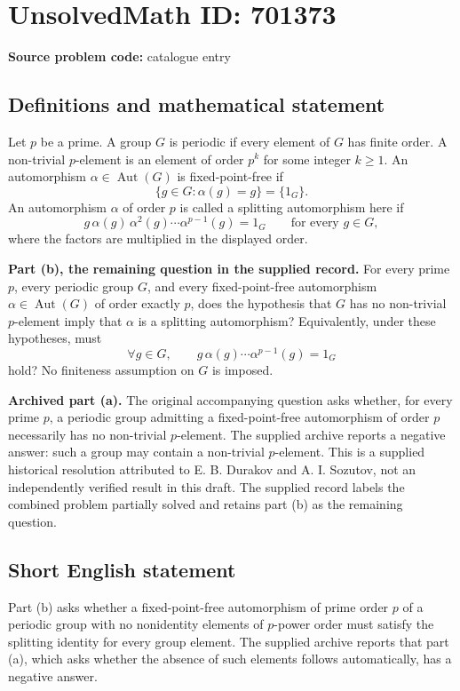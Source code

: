 \documentclass[11pt]{article}
\begin{document}
\section*{UnsolvedMath ID: 701373}
\textbf{Source problem code:} catalogue entry
\subsection{Definitions and mathematical statement}
Let \(p\) be a prime. A group \(G\) is periodic if every element of \(G\) has finite order. A non-trivial \(p\)-element is an element of order \(p^k\) for some integer \(k\geq 1\). An automorphism \(\alpha\in\operatorname{Aut}(G)\) is fixed-point-free if
\[
\{g\in G:\alpha(g)=g\}=\{1_G\}.
\]
An automorphism \(\alpha\) of order \(p\) is called a splitting automorphism here if
\[
 g\,\alpha(g)\,\alpha^2(g)\cdots\alpha^{p-1}(g)=1_G
 \qquad\text{for every }g\in G,
\]
where the factors are multiplied in the displayed order.

\textbf{Part (b), the remaining question in the supplied record.} For every prime \(p\), every periodic group \(G\), and every fixed-point-free automorphism \(\alpha\in\operatorname{Aut}(G)\) of order exactly \(p\), does the hypothesis that \(G\) has no non-trivial \(p\)-element imply that \(\alpha\) is a splitting automorphism? Equivalently, under these hypotheses, must
\[
\forall g\in G,\qquad
 g\,\alpha(g)\cdots\alpha^{p-1}(g)=1_G
\]
hold? No finiteness assumption on \(G\) is imposed.

\textbf{Archived part (a).} The original accompanying question asks whether, for every prime \(p\), a periodic group admitting a fixed-point-free automorphism of order \(p\) necessarily has no non-trivial \(p\)-element. The supplied archive reports a negative answer: such a group may contain a non-trivial \(p\)-element. This is a supplied historical resolution attributed to E. B. Durakov and A. I. Sozutov, not an independently verified result in this draft. The supplied record labels the combined problem partially solved and retains part (b) as the remaining question.
\subsection{Short English statement}
Part (b) asks whether a fixed-point-free automorphism of prime order \(p\) of a periodic group with no nonidentity elements of \(p\)-power order must satisfy the splitting identity for every group element. The supplied archive reports that part (a), which asks whether the absence of such elements follows automatically, has a negative answer.
\end{document}
